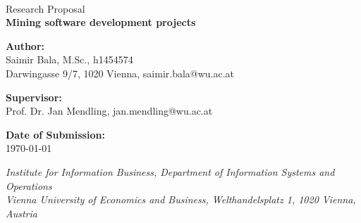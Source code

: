 \AddToShipoutPicture*{\BackgroundPic}
\thispagestyle{fancy}


{\vspace{2cm}~}
{\vspace{2cm}}

\bigskip\bigskip\bigskip\bigskip\bigskip\bigskip
\vspace*{2cm}
{\noindent\Large Research Proposal\\}
\vspace*{1cm}
{\noindent\Huge\textbf{Mining software development projects\\}}

{\vspace*{2cm}}
{\noindent\large {\bf Author:} \\Saimir Bala, M.Sc.,  h1454574\\ Darwingasse 9/7, 1020 Vienna,   saimir.bala@wu.ac.at \\}


\bigskip
{\noindent\large {\bf Supervisor:} \\Prof. Dr. Jan Mendling, jan.mendling@wu.ac.at}

\bigskip

{\noindent\large {\bf Date of Submission:} \\ \today}

\bigskip\bigskip\bigskip\bigskip

{\em\noindent Institute for Information Business, Department of Information Systems and Operations\\ Vienna University of
Economics and Business, Welthandelsplatz 1, 1020 Vienna, Austria
}


